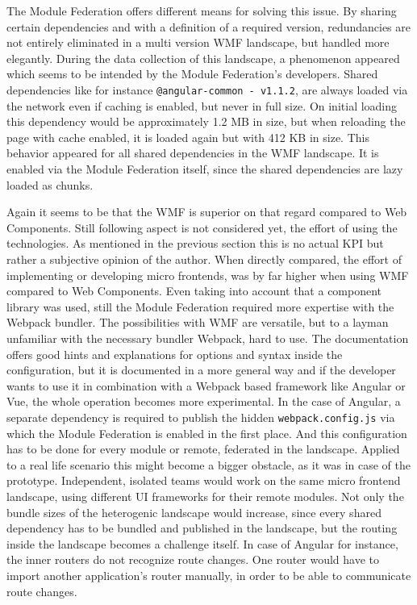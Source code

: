 The Module Federation offers different means for solving this issue. By sharing certain dependencies and with a definition of a required version, redundancies are not entirely eliminated in a multi version WMF landscape, but handled more elegantly. During the data collection of this landscape, a phenomenon appeared which seems to be intended by the Module Federation's developers. Shared dependencies like for instance \texttt{@angular-common - v1.1.2}, are always loaded via the network even if caching is enabled, but never in full size. On initial loading this dependency would be approximately 1.2 MB in size, but when reloading the page with cache enabled, it is loaded again but with 412 KB in size.
This behavior appeared for all shared dependencies in the WMF landscape. It is enabled via the Module Federation itself, since the shared dependencies are lazy loaded as chunks.\cite{wmf_the_good_and_ugly}

Again it seems to be that the WMF is superior on that regard compared to Web Components. Still following aspect is not considered yet, the effort of using the technologies. As mentioned in the previous section this is no actual KPI but rather a subjective opinion of the author. When directly compared, the effort of implementing or developing micro frontends, was by far higher when using WMF compared to Web Components. Even taking into account that a component library was used, still the Module Federation required more expertise with the Webpack bundler.
The possibilities with WMF are versatile, but to a layman unfamiliar with the necessary bundler Webpack, hard to use. The documentation offers good hints and explanations for options and syntax inside the configuration, but it is documented in a more general way and if the developer wants to use it in combination with a Webpack based framework like Angular or Vue, the whole operation becomes more experimental. In the case of Angular, a separate dependency is required to publish the hidden \texttt{webpack.config.js} via which the Module Federation is enabled in the first place. And this configuration has to be done for every module or remote, federated in the landscape. Applied to a real life scenario this might become a bigger obstacle, as it was in case of the prototype. Independent, isolated teams would work on the same micro frontend landscape, using different UI frameworks for their remote modules. Not only the bundle sizes of the heterogenic landscape would increase, since every shared dependency has to be bundled and published in the landscape, but the routing inside the landscape becomes a challenge itself. In case of Angular for instance, the inner routers do not recognize route changes. One router would have to import another application's router manually, in order to be able to communicate route changes.\cite{wmf_the_good_and_ugly}

